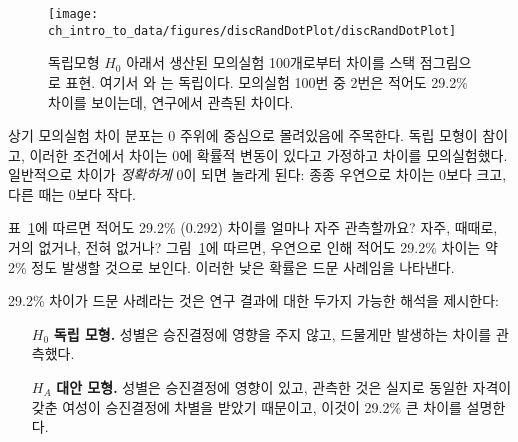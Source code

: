 \begin{figure}[ht]
\centering
\texttt{[image: ch\_intro\_to\_data/figures/discRandDotPlot/discRandDotPlot]}
\caption{
독립모형 $H_0$ 아래서 생산된 모의실험 100개로부터 차이를 스택 점그림으로 표현. 여기서  와 는 독립이다. 모의실험 100번 중 2번은 적어도 29.2\% 차이를 보이는데, 연구에서 관측된 차이다.}
\label{discRandDotPlot}
\end{figure}

상기 모의실험 차이 분포는 0 주위에 중심으로 몰려있음에 주목한다. 독립 모형이 참이고, 이러한 조건에서 차이는 0에 확률적 변동이 있다고 가정하고 차이를 모의실험했다. 일반적으로 차이가 \emph{정확하게} 0이 되면 놀라게 된다: 종종 우연으로 차이는 0보다 크고, 다른 때는 0보다 작다.

\begin{example}{표~\ref{discRandDotPlot}에 따르면 적어도 29.2\% (0.292) 차이를 얼마나 자주 관측할까요? 자주, 때때로, 거의 없거나, 전혀 없거나?}
그림~\ref{discRandDotPlot}에 따르면, 우연으로 인해 적어도 29.2\% 차이는 약 2\% 정도 발생할 것으로 보인다. 이러한 낮은 확률은 드문 사례임을 나타낸다.
\end{example}


29.2\% 차이가 드문 사례라는 것은 연구 결과에 대한 두가지 가능한 해석을 제시한다:

\begin{itemize}
\setlength{\itemsep}{0mm}
\item[$H_0$] \textbf{독립 모형.} 성별은 승진결정에 영향을 주지 않고, 드물게만 발생하는 차이를 관측했다.
\item[$H_A$] \textbf{대안 모형.} 성별은 승진결정에 영향이 있고, 관측한 것은 실지로 동일한 자격이 갖춘 여성이 승진결정에 차별을 받았기 때문이고, 이것이 29.2\% 큰 차이를 설명한다.
\end{itemize}

